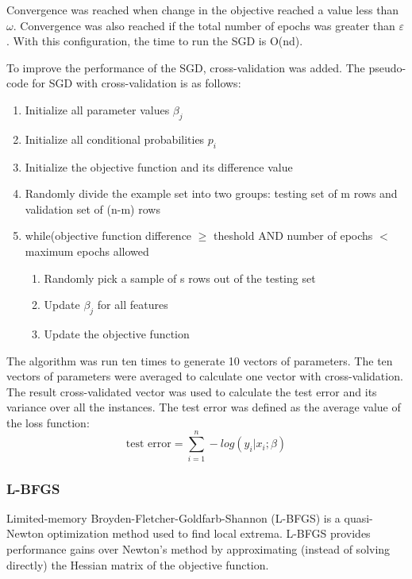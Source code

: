 Convergence was reached when change in the objective reached a value less than $\omega$. Convergence was also reached if the total number of epochs was greater than $\varepsilon$. With this configuration, the time to run the SGD is O(nd).

To improve the performance of the SGD, cross-validation was added. The pseudo-code for SGD with cross-validation is as follows:
\begin{enumerate}
    \item Initialize all parameter values $\beta_j$
    \item Initialize all conditional probabilities $p_i$
    \item Initialize the objective function and its difference value
    \item Randomly divide the example set into two groups: testing set of m rows and validation set of (n-m) rows
    \item while(objective function difference $\geq$ theshold AND number of epochs $<$ maximum epochs allowed
    \begin{enumerate}
        \item Randomly pick a sample of s rows out of the testing set
        \item Update $\beta_j$ for all features
        \item Update the objective function
    \end{enumerate}
\end{enumerate}

The algorithm was run ten times to generate 10 vectors of parameters. The ten vectors of parameters were averaged to calculate one vector with cross-validation. The result cross-validated vector was used to calculate the test error and its variance over all the instances. The test error was defined as the average value of the loss function:
\begin{equation}
        \textrm{test error} = \sum_{i=1}^{n} -log(y_i | x_i ; \beta )
\end{equation}


\subsubsection{L-BFGS}
Limited-memory Broyden-Fletcher-Goldfarb-Shannon (L-BFGS) is a quasi-Newton optimization method used to find local extrema. L-BFGS provides performance gains over Newton's method by approximating (instead of solving directly) the Hessian matrix of the objective function.



